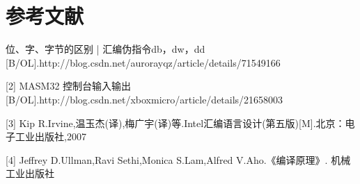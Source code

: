 \section*{ \centering 参考文献}
\begin{flushleft}
[1] 位、字、字节的区别 | 汇编伪指令db，dw，dd
[B/OL].http://blog.csdn.net/aurorayqz/article/details/71549166
\par
\vspace{3ex}
[2] MASM32 控制台输入输出
[B/OL].http://blog.csdn.net/xboxmicro/article/details/21658003
\par
\vspace{3ex}
[3] Kip R.Irvine,温玉杰(译),梅广宇(译)等.Intel汇编语言设计(第五版)[M].北京：电子工业出版社,2007
\par
\vspace{3ex}
[4] Jeffrey D.Ullman,Ravi Sethi,Monica S.Lam,Alfred V.Aho.《编译原理》.
机械工业出版社
\end{flushleft}
\clearpage

